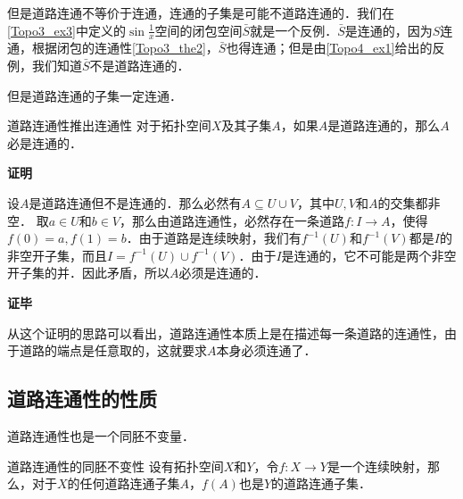 但是道路连通不等价于连通，连通的子集是可能不道路连通的．我们在\autoref{Topo3_ex3}中定义的$\sin{\frac{1}{x}}$空间的闭包空间$\bar{S}$就是一个反例．$\bar{S}$是连通的，因为$S$连通，根据闭包的连通性\autoref{Topo3_the2}，$\bar{S}$也得连通；但是由\autoref{Topo4_ex1}给出的反例，我们知道$\bar{S}$不是道路连通的．

但是道路连通的子集一定连通．

\begin{theorem}{道路连通性推出连通性}\label{Topo4_the1}
对于拓扑空间$X$及其子集$A$，如果$A$是道路连通的，那么$A$必是连通的．
\end{theorem}

\textbf{证明}

设$A$是道路连通但不是连通的．那么必然有$A\subseteq U\cup V$，其中$U, V$和$A$的交集都非空．
取$a\in U$和$b\in V$，那么由道路连通性，必然存在一条道路$f:I\rightarrow A$，使得$f(0)=a, f(1)=b$．由于道路是连续映射，我们有$f^{-1}(U)$和$f^{-1}(V)$都是$I$的非空开子集，而且$I=f^{-1}(U)\cup f^{-1}(V)$．由于$I$是连通的，它不可能是两个非空开子集的并．因此矛盾，所以$A$必须是连通的．

\textbf{证毕}

从这个证明的思路可以看出，道路连通性本质上是在描述每一条道路的连通性，由于道路的端点是任意取的，这就要求$A$本身必须连通了．

\subsection{道路连通性的性质}

道路连通性也是一个同胚不变量．

\begin{theorem}{道路连通性的同胚不变性}
设有拓扑空间$X$和$Y$，令$f:X\rightarrow Y$是一个连续映射，那么，对于$X$的任何道路连通子集$A$，$f(A)$也是$Y$的道路连通子集．
\end{theorem}